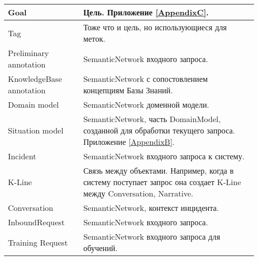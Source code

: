 \begin{longtable}{|p{5cm}|p{10cm}|}
   \hline
   Goal  & Цель. Приложение \ref{AppendixC}. \\
   \hline
   Tag & Тоже что и цель, но использующиеся для меток. \\
   \hline
   Preliminary annotation  & SemanticNetwork входного запроса. \\
   \hline
   KnowledgeBase annotation  & SemanticNetwork с сопостовлением концепциям Базы Знаний. \\
   \hline
   Domain model  & SemanticNetwork доменной модели. \\
   \hline
   Situation model  & SemanticNetwork, часть DomainModel, созданной для обработки текущего запроса. Приложение \ref{AppendixB}. \\
   \hline
   Incident  & SemanticNetwork входного запроса к систему. \\
   \hline
   K-Line  & Связь между объектами. Например, когда в систему поступает запрос она создает K-Line между Conversation, Narrative. \\
   \hline
   Conversation  & SemanticNetwork, контекст инцидента. \\
   \hline
   InboundRequest  & SemanticNetwork входного запроса. \\
   \hline
   Training Request  & SemanticNetwork входного запроса для обучений. \\
   \hline
   
  \end{longtable}

\clearpage
